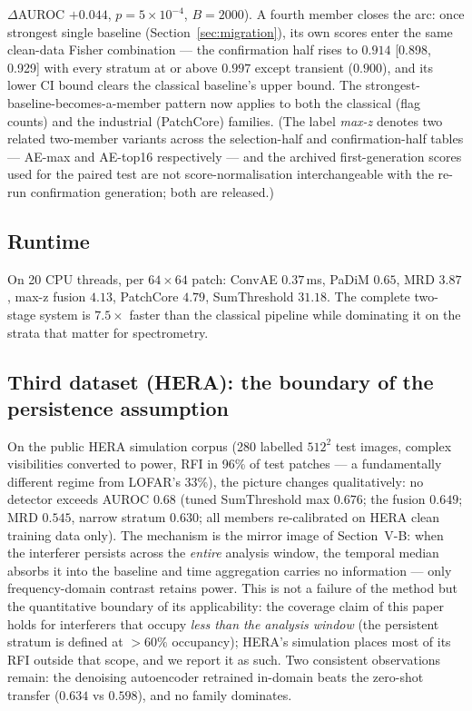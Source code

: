 \documentclass[journal]{IEEEtran}
\begin{document}
$\Delta$AUROC $+0.044$, $p=5\times10^{-4}$, $B{=}2000$).
A fourth member closes the arc: once
strongest single baseline (Section~\ref{sec:migration}), its own scores
enter the same clean-data Fisher combination --- the confirmation half
rises to $0.914$ [0.898, 0.929] with every stratum at or above $0.997$
except transient ($0.900$), and its lower CI bound clears the classical
baseline's upper bound.  The strongest-baseline-becomes-a-member pattern
now applies to both the classical (flag counts) and the industrial
(PatchCore) families. (The label \emph{max-z} denotes two related two-member variants across the selection-half and confirmation-half tables --- AE-max and AE-top16 respectively --- and the archived first-generation scores used for the paired test are not score-normalisation interchangeable with the re-run confirmation generation; both are released.)

\subsection{Runtime}
On 20 CPU threads, per $64\times64$ patch: ConvAE $0.37$\,ms, PaDiM $0.65$,
MRD $3.87$, max-z fusion $4.13$, PatchCore $4.79$, SumThreshold $31.18$.
The complete two-stage system is $7.5\times$ faster than the classical
pipeline while dominating it on the strata that matter for spectrometry.

\subsection{Third dataset (HERA): the boundary of the persistence assumption}
\label{sec:hera}
On the public HERA simulation corpus (280 labelled $512^2$ test images,
complex visibilities converted to power, RFI in 96\% of test patches ---
a fundamentally different regime from LOFAR's 33\%), the picture changes
qualitatively: no detector exceeds AUROC $0.68$ (tuned SumThreshold max
$0.676$; the fusion $0.649$; MRD $0.545$, narrow stratum $0.630$; all
members re-calibrated on HERA clean training data only).  The mechanism is
the mirror image of Section~V-B: when the interferer persists across the
\emph{entire} analysis window, the temporal median absorbs it into the
baseline and time aggregation carries no information --- only frequency-domain
contrast retains power.  This is not a failure of the method but the
quantitative boundary of its applicability: the coverage claim of this
paper holds for interferers that occupy \emph{less than the analysis
window} (the persistent stratum is defined at $>60\%$ occupancy); HERA's
simulation places most of its RFI outside that scope, and we report it as
such.  Two consistent observations remain: the denoising autoencoder
retrained in-domain beats the zero-shot transfer ($0.634$ vs $0.598$), and
no family dominates.
\end{document}
